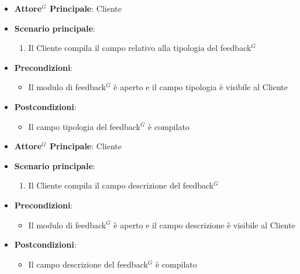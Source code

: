 \label{uc_23.1}
\begin{itemize}
    \item \textbf{Attore$^G$ Principale}: Cliente
	\item \textbf{Scenario principale}:
	\begin{enumerate}
		\item Il Cliente compila il campo relativo alla tipologia del feedback$^G$
	\end{enumerate}
	\item \textbf{Precondizioni}:
	\begin{itemize}
		\item Il modulo di feedback$^G$ è aperto e il campo tipologia è visibile al Cliente
	\end{itemize}
	\item \textbf{Postcondizioni}:
	\begin{itemize}
		\item Il campo tipologia del feedback$^G$ è compilato
	\end{itemize}
\end{itemize}

\label{uc_23.2}
\begin{itemize}
    \item \textbf{Attore$^G$ Principale}: Cliente
	\item \textbf{Scenario principale}:
	\begin{enumerate}
		\item Il Cliente compila il campo descrizione del feedback$^G$
	\end{enumerate}
	\item \textbf{Precondizioni}:
	\begin{itemize}
		\item Il modulo di feedback$^G$ è aperto e il campo descrizione è visibile al Cliente
	\end{itemize}
	\item \textbf{Postcondizioni}:
	\begin{itemize}
		\item Il campo descrizione del feedback$^G$ è compilato
	\end{itemize}
\end{itemize}


